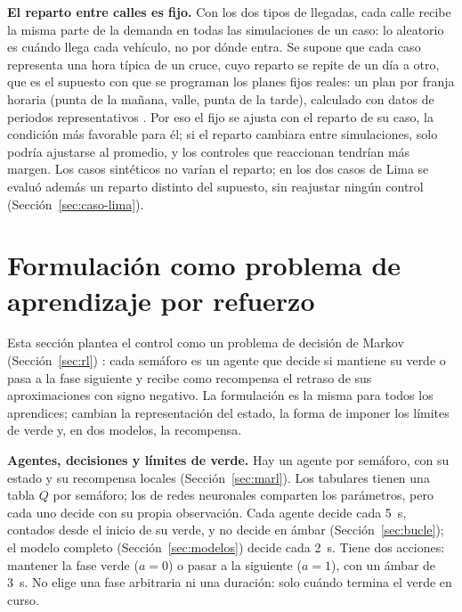 \noindent\textbf{El reparto entre calles es fijo.} Con los dos tipos de
llegadas, cada calle recibe la misma parte de la demanda en todas las
simulaciones de un caso: lo aleatorio es cuándo llega cada vehículo, no
por dónde entra. Se supone que cada caso representa una hora típica de
un cruce, cuyo reparto se repite de un día a otro, que es el supuesto
con que se programan los planes fijos reales: un plan por franja
horaria (punta de la mañana, valle, punta de la tarde), calculado con
datos de periodos representativos \citep{Koonce2008_TSTM}. Por eso el
fijo se ajusta con el reparto de su caso, la condición más favorable
para él; si el reparto cambiara entre simulaciones, solo podría
ajustarse al promedio, y los controles que reaccionan tendrían más
margen. Los casos sintéticos no varían el reparto; en los dos casos de
Lima se evaluó además un reparto distinto del supuesto, sin reajustar
ningún control (Sección~\ref{sec:caso-lima}).


\section{Formulación como problema de aprendizaje por refuerzo}
\label{sec:formulacion}

Esta sección plantea el control como un problema de decisión de Markov
(Sección~\ref{sec:rl}) \citep{SuttonBarto2018}: cada semáforo es un
agente que decide si mantiene su verde o pasa a la fase siguiente y
recibe como recompensa el retraso de sus aproximaciones con signo
negativo. La formulación es la misma para todos los
aprendices; cambian la representación del estado, la forma de imponer
los límites de verde y, en dos modelos, la recompensa.

\noindent\textbf{Agentes, decisiones y límites de verde.} Hay un agente
por semáforo, con su estado y su recompensa locales
(Sección~\ref{sec:marl}). Los tabulares tienen una tabla $Q$ por
semáforo; los de redes neuronales comparten los parámetros, pero cada
uno decide con su propia observación. Cada agente decide cada 5~s,
contados desde el inicio de su verde, y no decide en ámbar
(Sección~\ref{sec:bucle}); el modelo completo
(Sección~\ref{sec:modelos}) decide cada 2~s. Tiene dos acciones:
mantener la fase verde ($a = 0$) o pasar a la siguiente ($a = 1$), con
un ámbar de 3~s. No elige una fase arbitraria ni una duración: solo
cuándo termina el verde en curso.

